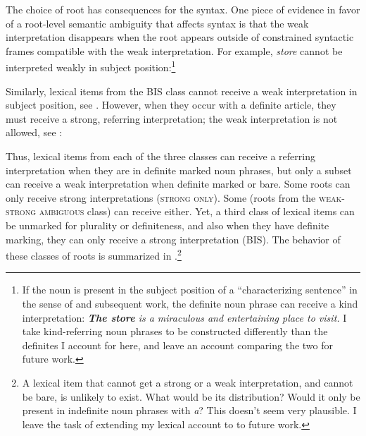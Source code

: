 \documentclass[output=paper,
modfonts
]{langscibook}
\begin{document}
The choice of root has consequences for the syntax. One piece of evidence in favor of a root-level semantic ambiguity that affects syntax is that the weak interpretation disappears when the root appears outside of constrained syntactic frames compatible with the weak interpretation. For example, \textit{store} cannot be interpreted weakly in subject position:\footnote{If the noun is present in the subject position of a ``characterizing sentence'' in the sense of \citet{Carlson1977} and subsequent work, the definite noun phrase can receive a kind interpretation: 
\ea 
\textit{\textbf{The store} is a miraculous and entertaining place to visit.}
\z 
I take kind-referring noun phrases to be constructed differently than the definites I account for here, and leave an account comparing the two for future work.}

\begin{exe}
\end{exe}

Similarly, lexical items from the BIS class cannot receive a weak interpretation in subject position, see . However, when they occur with a definite article, they must receive a strong, referring interpretation; the weak interpretation is not allowed, see :

\begin{exe}
\end{exe}

Thus, lexical items from each of the three classes can receive a referring interpretation when they are in definite marked noun phrases, but only a subset can receive a weak interpretation when definite marked or bare. Some roots can only receive strong interpretations (\textsc{strong only}). Some (roots from the \textsc{weak-strong ambiguous} class) can receive either. Yet, a third class of lexical items can be unmarked for plurality or definiteness, and also when they have definite marking, they can only receive a strong interpretation (\textsc{BIS}). The behavior of these classes of roots is summarized in .\footnote{A lexical item that cannot get a strong or a weak interpretation, and cannot be bare, is unlikely to exist. What would be its distribution? Would it only be present in indefinite noun phrases with \textit{a}? This doesn't seem very plausible. I leave the task of extending my lexical account to  to future work.} 
\end{document}
